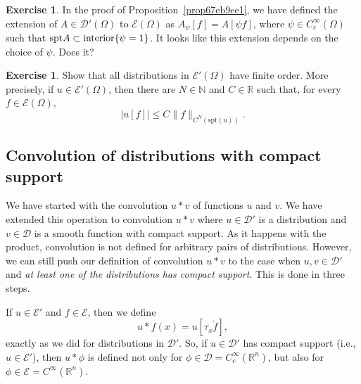 \documentclass[a4paper,9pt]{amsart}
\newcommand{\scr}[1]{\mathscr{#1}}
\newcommand{\N}{\mathbb{N}}	%
\newcommand{\R}{\mathbb{R}}	%
\newcommand{\spt}{\mathrm{spt}}
\theoremstyle{plain}
\theoremstyle{definition}
\newtheorem{exercise}[proposition]{Exercise}%
\theoremstyle{remark}
\begin{document}
\begin{exercise}
	In the proof of Proposition~\ref{prop67eb9ee1}, we have defined the extension of $A\in\scr D'(\Omega)$ to $\scr E(\Omega)$ as $A_\psi[f] = A[\psi f]$,
	where $\psi\in C^\infty_c(\Omega)$ such that $\spt A \subset{\rm interior}\{\psi=1\}$.
	It looks like this extension depends on the choice of $\psi$.
	Does it?
\end{exercise}

\begin{exercise}\label{ex67f29a5b}
	Show that all distributions in $\scr E'(\Omega)$ have finite order.
	More precisely, if $u\in\scr E'(\Omega)$, then there are $N\in\N$ and $C\in\R$ such that, for every $f\in\scr E(\Omega)$,
	\begin{equation}
		|u[f]| \le C \|f\|_{C^N(\spt(u))} .
	\end{equation}
\end{exercise}

\subsection{Convolution of distributions with compact support}
We have started with the convolution $u*v$ of functions $u$ and $v$.
We have extended this operation to convolution $u*v$ where $u\in\scr D'$ is a distribution and $v\in\scr D$ is a smooth function with compact support.
As it happens with the product, convolution is not defined for arbitrary pairs of distributions.
However, we can still push our definition of convolution $u*v$ to the case when $u,v\in\scr D'$ and {\it at least one of the distributions has compact support}.
This is done in three steps.

If $u\in\scr E'$ and $f\in\scr E$, then we define
\begin{equation}\label{eq67f21bf6}
	u * f (x) = u[\tau_x\check f] ,
\end{equation}
exactly as we did for distributions in $\scr D'$.
So, if $u\in\scr D'$ has compact support (i.e., $u\in\scr E'$), then $u*\phi$ is defined not only for $\phi\in\scr D = C^\infty_c(\R^n)$, but also for $\phi\in\scr E = C^\infty(\R^n)$.
\end{document}
